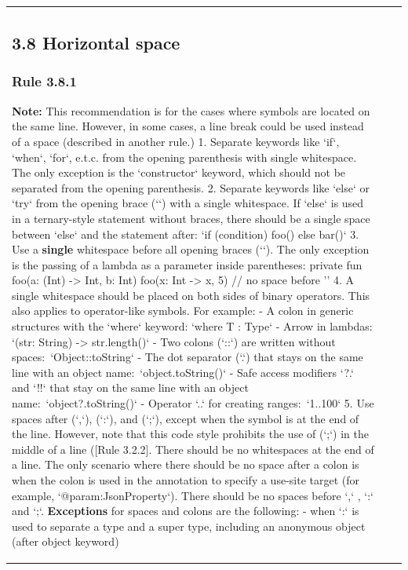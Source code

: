 \begin{center}
\begin{tabular}{ |p{}|p{}|p{}| }
{{\subsection*{\textbf{3.8 Horizontal space}}
\subsubsection*{\textbf{Rule 3.8.1}}
\textbf{Note:} This recommendation is for the cases where symbols are located on the same line. However, in some cases, a line break could be used instead of a space (described in another rule.)
1.  Separate keywords like `if`, `when`, `for`, e.t.c. from the opening parenthesis with single whitespace.
    The only exception is the `constructor` keyword, which should not be separated from the opening parenthesis.
2.  Separate keywords like `else` or `try` from the opening brace (`{`) with a single whitespace.
    If `else` is used in a ternary-style statement without braces, there should be a single space between `else` and the statement after: `if (condition) foo() else bar()`
3.  Use a \textbf{single} whitespace before all opening braces (`{`). The only exception is the passing of a lambda as a parameter inside parentheses:
     private fun foo(a: (Int) -> Int, b: Int) {}
     foo({x: Int -> x}, 5) // no space before '{'
4.  A single whitespace should be placed on both sides of binary operators. This also applies to operator-like symbols.
    For example:
 - A colon in generic structures with the `where` keyword:  `where T : Type`
 - Arrow in lambdas: `(str: String) -> str.length()`
- Two colons (`::`) are written without spaces:\
  `Object::toString`
- The dot separator (`.`) that stays on the same line with an object name:\
  `object.toString()`
- Safe access modifiers `?.` and `!!` that stay on the same line with an object name:\
  `object?.toString()`
- Operator `..` for creating ranges:\
  `1..100`
5.  Use spaces after (`,`), (`:`), and (`;`), except when the symbol is at the end of the line.
    However, note that this code style prohibits the use of (`;`) in the middle of a line ([Rule 3.2.2].
    There should be no whitespaces at the end of a line.
    The only scenario where there should be no space after a colon is when the colon is used in the annotation to specify a use-site target (for example, `@param:JsonProperty`).
    There should be no spaces before `,` , `:` and `;`.
    \textbf{Exceptions} for spaces and colons are the following:
    - when `:` is used to separate a type and a super type, including an anonymous object (after object keyword)
}}}}}
\end{tabular}
\end{center}
